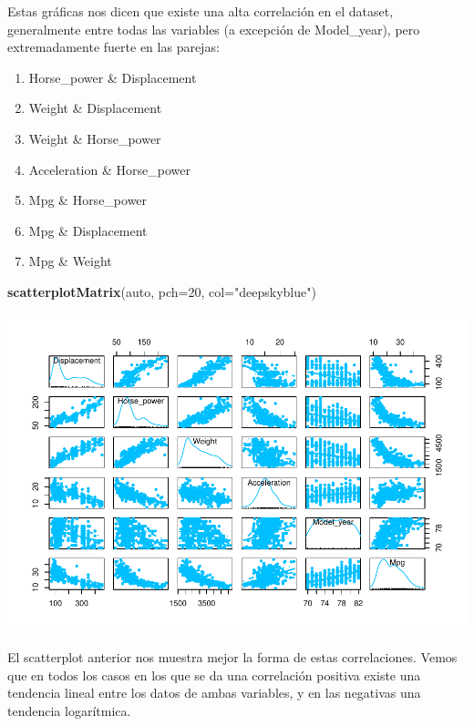 \documentclass[
]{article}
\newenvironment{Shaded}{\begin{snugshade}}{\end{snugshade}}
\newcommand{\DataTypeTok}[1]{\textcolor[rgb]{0.13,0.29,0.53}{#1}}
\newcommand{\DecValTok}[1]{\textcolor[rgb]{0.00,0.00,0.81}{#1}}
\newcommand{\KeywordTok}[1]{\textcolor[rgb]{0.13,0.29,0.53}{\textbf{#1}}}
\newcommand{\NormalTok}[1]{#1}
\newcommand{\StringTok}[1]{\textcolor[rgb]{0.31,0.60,0.02}{#1}}
\providecommand{\tightlist}{%
  \setlength{\itemsep}{0pt}\setlength{\parskip}{0pt}}
\begin{document}
Estas gráficas nos dicen que existe una alta correlación en el dataset,
generalmente entre todas las variables (a excepción de Model\_year),
pero extremadamente fuerte en las parejas:

\begin{enumerate}
\def\labelenumi{\arabic{enumi}.}
\tightlist
\item
  Horse\_power \& Displacement
\item
  Weight \& Displacement
\item
  Weight \& Horse\_power
\item
  Acceleration \& Horse\_power
\item
  Mpg \& Horse\_power
\item
  Mpg \& Displacement
\item
  Mpg \& Weight
\end{enumerate}

\begin{Shaded}
\begin{Highlighting}[]
\KeywordTok{scatterplotMatrix}\NormalTok{(auto, }\DataTypeTok{pch=}\DecValTok{20}\NormalTok{, }\DataTypeTok{col=}\StringTok{"deepskyblue"}\NormalTok{)}
\end{Highlighting}
\end{Shaded}

\begin{center}\includegraphics{EDA_files/figure-latex/unnamed-chunk-20-1} \end{center}

El scatterplot anterior nos muestra mejor la forma de estas
correlaciones. Vemos que en todos los casos en los que se da una
correlación positiva existe una tendencia lineal entre los datos de
ambas variables, y en las negativas una tendencia logarítmica.
\end{document}
